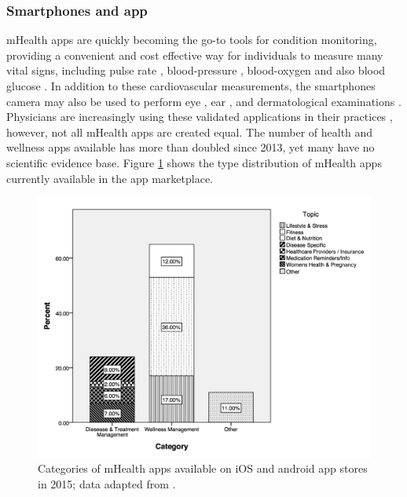 \subsubsection{Smartphones and app}
mHealth apps are quickly becoming the go-to tools for condition monitoring, providing a convenient and cost effective way for individuals to measure many vital signs, including pulse rate \cite{Led2015, Baig2013}, blood-pressure \cite{Moser2015}, blood-oxygen \cite{Led2015, Moser2015} and also blood glucose \cite{Moser2015}. In addition to these cardiovascular measurements, the smartphones camera may also be used to perform eye \cite{Maamari2014}, ear \cite{Rappaport2015}, and dermatological examinations \cite{Kassianos2015}. Physicians are increasingly using these validated applications in their practices \cite{Topol2012}, however, not all mHealth apps are created equal. The number of health and wellness apps available has more than doubled since 2013, yet many have no scientific evidence base. Figure \ref{fig: imshealth-mhealthapps} shows the type distribution of mHealth apps currently available  in the app marketplace.

\begin{figure}[h]
    \centering
    \includegraphics[scale=0.25, angle=0]{Files/literature-review/figures/imshealth-mhealthapps}
    \caption{Categories of mHealth apps available on iOS and android app stores in 2015; data adapted from \cite{IMSmHealth2015}.}
    \label{fig: imshealth-mhealthapps}
\end{figure}

